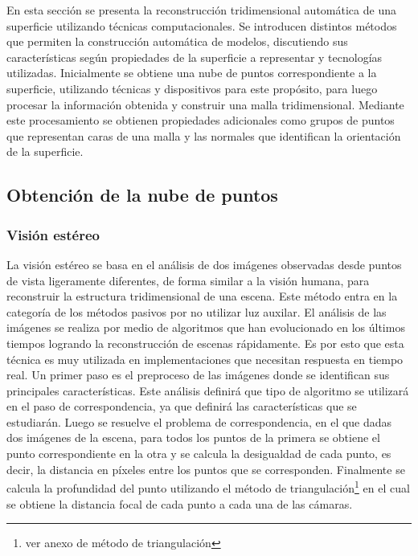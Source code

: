 En esta sección se presenta la reconstrucción tridimensional automática de una superficie utilizando técnicas computacionales.
Se introducen distintos métodos que permiten la construcción automática de modelos, discutiendo sus características según propiedades de la superficie a representar y tecnologías utilizadas. Inicialmente se obtiene una nube de puntos correspondiente a la superficie, utilizando técnicas y dispositivos para este propósito, para luego procesar la información obtenida y construir una malla tridimensional. Mediante este procesamiento se obtienen propiedades adicionales como grupos de puntos que representan caras de una malla y las normales que identifican la orientación de la superficie.

\subsection{Obtención de la nube de puntos}

\subsubsection{Visión estéreo}

La visión estéreo se basa en el análisis de dos imágenes observadas desde puntos de vista ligeramente diferentes, de forma similar a la visión humana, para reconstruir la estructura tridimensional de una escena. Este método entra en la categoría de los métodos pasivos por no utilizar luz auxilar. El análisis de las imágenes se realiza por medio de algoritmos que han evolucionado en los últimos tiempos logrando la reconstrucción de escenas rápidamente. Es por esto que esta técnica es muy utilizada en implementaciones que necesitan respuesta en tiempo real.
Un primer paso es el preproceso de las imágenes donde se identifican sus principales características. Este análisis definirá que tipo de algoritmo se utilizará en el paso de correspondencia, ya que definirá las características que se estudiarán. Luego se resuelve el problema de correspondencia, en el que dadas dos imágenes de la escena, para todos los puntos de la primera se obtiene el punto correspondiente en la otra y se calcula la desigualdad de cada punto, es decir, la distancia en píxeles entre los puntos que se corresponden. Finalmente se calcula la profundidad del punto utilizando el método de triangulación\footnote{ver anexo de método de triangulación} en el cual se obtiene la distancia focal de cada punto a cada una de las cámaras\cite{StereoReview}.

